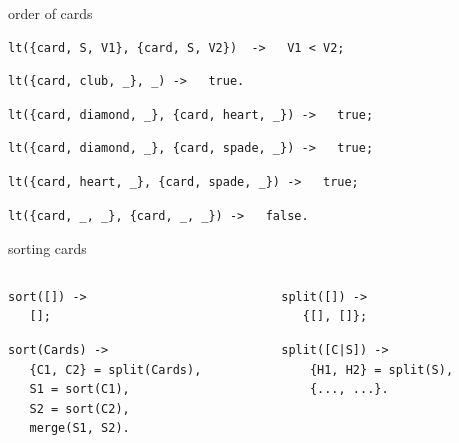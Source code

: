 \begin{frame}[fragile]{order of cards}

\pause
\begin{verbatim}
lt({card, S, V1}, {card, S, V2})  ->   V1 < V2;
\end{verbatim}
\pause
\begin{verbatim}
lt({card, club, _}, _) ->   true.
\end{verbatim}
\pause
\begin{verbatim}
lt({card, diamond, _}, {card, heart, _}) ->   true;
\end{verbatim}
\pause
\begin{verbatim}
lt({card, diamond, _}, {card, spade, _}) ->   true;
\end{verbatim}
\pause
\begin{verbatim}
lt({card, heart, _}, {card, spade, _}) ->   true; 
\end{verbatim}
\pause
\begin{verbatim}
lt({card, _, _}, {card, _, _}) ->   false.
\end{verbatim}

\end{frame}

\begin{frame}[fragile]{sorting cards}

\begin{columns}

 \begin{column}{0.5\linewidth}
\begin{verbatim}
sort([]) -> 
   [];
\end{verbatim}
\pause
\begin{verbatim}
sort(Cards) -> 
   {C1, C2} = split(Cards),
   S1 = sort(C1),
   S2 = sort(C2),
   merge(S1, S2).
\end{verbatim}
 \end{column}
 
 \pause

 \begin{column}{0.5\linewidth}
\begin{verbatim}
split([]) ->
   {[], []};
\end{verbatim}
\pause
\begin{verbatim}
split([C|S]) ->
    {H1, H2} = split(S),
    {..., ...}.
\end{verbatim}
 \end{column}
\end{columns}

\end{frame}


